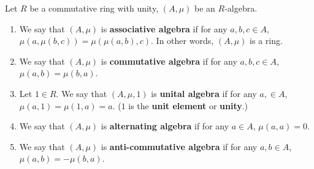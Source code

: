 \begin{definition}
  Let $R$ be a commutative ring with unity, $(A, \mu)$ be an $R$-algebra.
  \begin{enumerate}
    \item
      We say that $(A, \mu)$ is \textbf{associative algebra} if
      for any $a, b, c \in A$, $\mu(a, \mu(b, c)) = \mu(\mu(a, b), c)$.
      In other words, $(A, \mu)$ is a ring.
    \item
      We say that $(A, \mu)$ is \textbf{commutative algebra} if
      for any $a, b, c \in A$, $\mu(a, b) = \mu(b, a)$.
    \item
      Let $1 \in R$.
      We say that $(A, \mu, 1)$ is \textbf{unital algebra} if
      for any $a, \in A$, $\mu(a, 1) = \mu(1, a) = a$.
      ($1$ is the \textbf{unit element} or \textbf{unity}.)
    \item
      We say that $(A, \mu)$ is \textbf{alternating algebra} if
      for any $a \in A$, $\mu(a, a) = 0$.
    \item
      We say that $(A, \mu)$ is \textbf{anti-commutative algebra} if
      for any $a, b \in A$, $\mu(a, b) = - \mu(b, a)$.
  \end{enumerate}
\end{definition}
